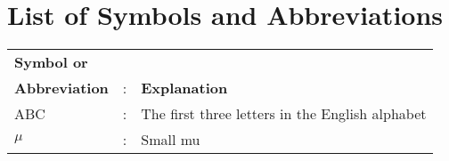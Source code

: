 \chapter*{List of Symbols and Abbreviations}

\begin{tabular}{lcl}
    \textbf{Symbol or}&&\\
    \textbf{Abbreviation} &:& \textbf{Explanation}\\
    
    
    ABC &:& The first three letters in the English alphabet\\
    $\mu$ &:& Small mu\\
    
\end{tabular}

\clearpage